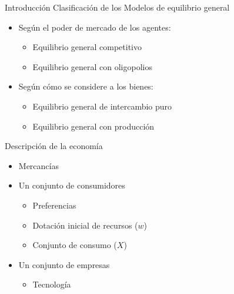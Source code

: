 \begin{frame}{Introducción}
	Clasificación de los Modelos de equilibrio general
		\begin{itemize}
			\item Según el poder de mercado de los agentes:
				\begin{itemize}
					\item Equilibrio general competitivo
					\item Equilibrio general con oligopolios
				\end{itemize}
			\item Según cómo se considere a los bienes:
				\begin{itemize}
					\item Equilibrio general de intercambio puro
					\item Equilibrio general con producción
				\end{itemize}
		\end{itemize}
\end{frame}
\begin{frame}{Descripción de la economía}
	\begin{itemize}
		\item Mercancías
		\item Un conjunto de consumidores
			\begin{itemize}
				\item Preferencias
				\item Dotación inicial de recursos ($w$)
				\item Conjunto de consumo ($X$)
			\end{itemize}
		\item Un conjunto de empresas
			\begin{itemize}
				\item Tecnología
			\end{itemize}
	\end{itemize}
\end{frame}
